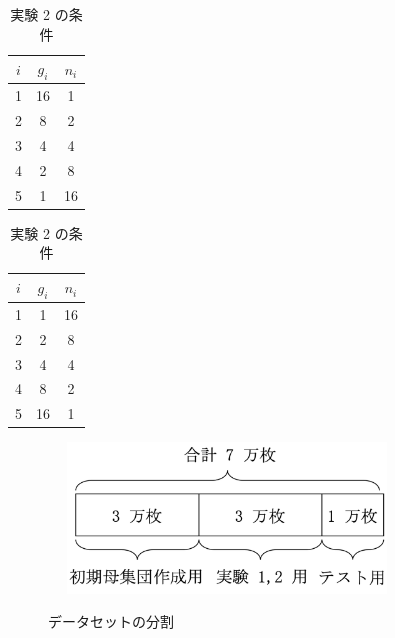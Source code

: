 \documentclass[twocolumn]{jarticle}     %
\begin{document}
\begin{table}[ht]
  \caption{実験 2 の条件}
  \begin{minipage}[ht]{.20\textwidth}
    \begin{center}
      \begin{tabular}{|c|c|c|}
        \hline
        $i$&$g_i$&$n_i$ \\ \hline
        1&16&1 \\ \hline
        2&8&2 \\ \hline
        3&4&4 \\ \hline
        4&2&8 \\ \hline
        5&1&16 \\ \hline
      \end{tabular}
    \end{center}
    \label{実験条件2_1}
  \end{minipage}
  \hfill
  \begin{minipage}[ht]{.20\textwidth}
    \begin{center}
      \begin{tabular}{|c|c|c|}
        \hline
        $i$&$g_i$&$n_i$ \\ \hline 
        1&1&16 \\ \hline
        2&2&8 \\ \hline
        3&4&4 \\ \hline
        4&8&2 \\ \hline
        5&16&1 \\ \hline
      \end{tabular}
    \end{center}
    \label{実験条件2_2}
  \end{minipage}
\end{table}

\begin{figure}[ht]
    \centering　
    \includegraphics[height=4cm]{dataset_devide.png}
    \caption{データセットの分割}
    \label{dataset}
\end{figure}
\end{document}
